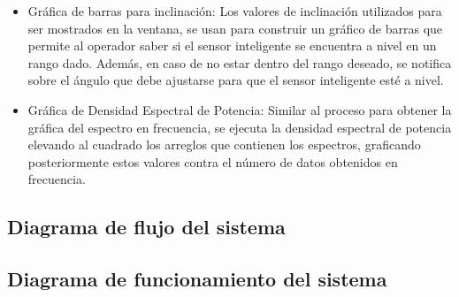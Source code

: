 \begin{itemize}
    \item Gráfica de barras para inclinación: Los valores de inclinación utilizados para ser mostrados en la ventana, se usan para construir un gráfico de barras que permite al operador saber si el sensor inteligente se encuentra a nivel en un rango dado. Además, en caso de no estar dentro del rango deseado, se notifica sobre el ángulo que debe ajustarse para que el sensor inteligente esté a nivel.
    
    \item Gráfica de Densidad Espectral de Potencia: Similar al proceso para obtener la gráfica del espectro en frecuencia, se ejecuta la densidad espectral de potencia elevando al cuadrado los arreglos que contienen los espectros, graficando posteriormente estos valores contra el número de datos obtenidos en frecuencia.
\end{itemize}

\subsection{Diagrama de flujo del sistema}


\subsection{Diagrama de funcionamiento del sistema}
